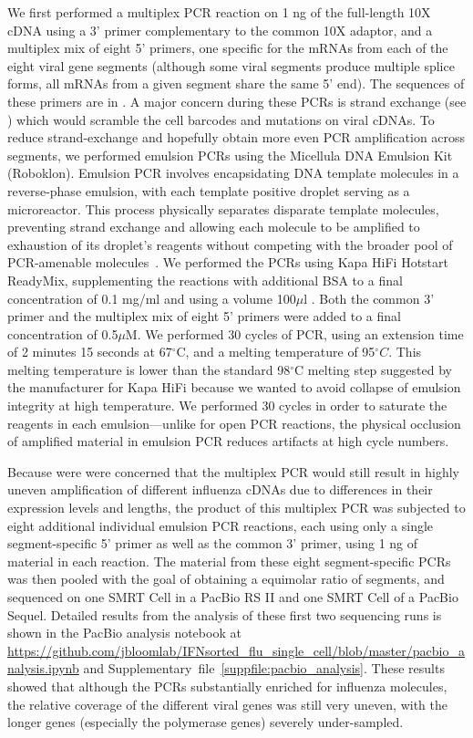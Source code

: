 \documentclass[9pt,lineno]{elife}
\begin{document}
We first performed a multiplex PCR reaction on 1 ng of the full-length 10X cDNA using a 3' primer complementary to the common 10X adaptor, and a multiplex mix of eight 5' primers, one specific for the mRNAs from each of the eight viral gene segments (although some viral segments produce multiple splice forms, all mRNAs from a given segment share the same 5' end).
The sequences of these primers are in .
A major concern during these PCRs is strand exchange (see ) which would scramble the cell barcodes and mutations on viral cDNAs.
To reduce strand-exchange and hopefully obtain more even PCR amplification across segments, we performed emulsion PCRs using the Micellula DNA Emulsion Kit (Roboklon).
Emulsion PCR involves encapsidating DNA template molecules in a reverse-phase emulsion, with each template positive droplet serving as a microreactor.
This process physically separates disparate template molecules, preventing strand exchange and allowing each molecule to be amplified to exhaustion of its droplet's reagents without competing with the broader pool of PCR-amenable molecules~\citep{Boers:2015emulsion}.
We performed the PCRs using Kapa HiFi Hotstart ReadyMix, supplementing the reactions with additional BSA to a final concentration of 0.1 mg/ml and using a volume 100$\mu$l .
Both the common 3' primer and the multiplex mix of eight 5' primers were added to a final concentration of 0.5$\mu$M.
We performed 30 cycles of PCR, using an extension time of 2 minutes 15 seconds at 67$^{\circ}$C, and a melting temperature of 95$^{\circ}C$.
This melting temperature is lower than the standard 98$^{\circ}$C melting step suggested by the manufacturer for Kapa HiFi because we wanted to avoid collapse of emulsion integrity at high temperature.
We performed 30 cycles in order to saturate the reagents in each emulsion---unlike for open PCR reactions, the physical occlusion of amplified material in emulsion PCR reduces artifacts at high cycle numbers.

Because were were concerned that the multiplex PCR would still result in highly uneven amplification of different influenza cDNAs due to differences in their expression levels and lengths, the product of this multiplex PCR was subjected to eight additional individual emulsion PCR reactions, each using only a single segment-specific 5' primer as well as the common 3' primer, using 1 ng of material in each reaction.
The material from these eight segment-specific PCRs was then pooled with the goal of obtaining a equimolar ratio of segments, and sequenced on one SMRT Cell in a PacBio RS II and one SMRT Cell of a PacBio Sequel. 
Detailed results from the analysis of these first two sequencing runs is shown in the PacBio analysis notebook at \url{https://github.com/jbloomlab/IFNsorted_flu_single_cell/blob/master/pacbio_analysis.ipynb} and Supplementary~file~\ref{suppfile:pacbio_analysis}.
These results showed that although the PCRs substantially enriched for influenza molecules, the relative coverage of the different viral genes was still very uneven, with the longer genes (especially the polymerase genes) severely under-sampled.
\end{document}

